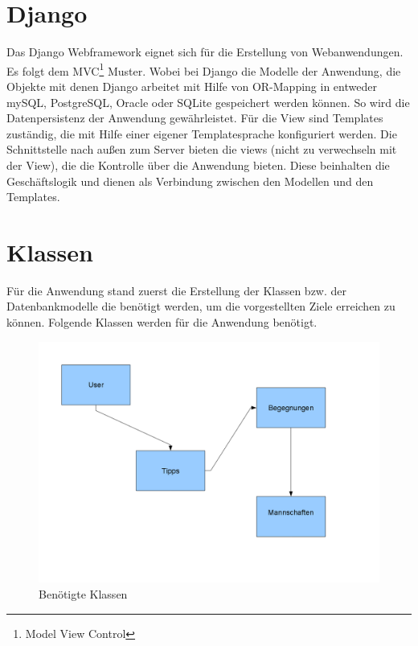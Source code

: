 \section{Django}
Das Django Webframework eignet sich für die Erstellung von Webanwendungen. Es
folgt dem MVC\footnote{Model View Control} Muster. Wobei bei Django die Modelle
der Anwendung, die Objekte mit denen Django arbeitet mit Hilfe von OR-Mapping
in entweder mySQL, PostgreSQL, Oracle oder SQLite gespeichert werden können. So
wird die Datenpersistenz der Anwendung gewährleistet. Für die View sind
Templates zuständig, die mit Hilfe einer eigener Templatesprache konfiguriert
werden. Die Schnittstelle nach außen zum Server bieten die views (nicht zu
verwechseln mit der View), die die Kontrolle über die Anwendung bieten. Diese
beinhalten die Geschäftslogik und dienen als Verbindung zwischen den Modellen
und den Templates.

\section{Klassen}
Für die Anwendung stand zuerst die Erstellung der Klassen bzw. der
Datenbankmodelle die benötigt werden, um die vorgestellten Ziele erreichen zu
können. Folgende Klassen werden für die Anwendung benötigt. 

\begin{figure}[ht]
 \begin{center}
  \includegraphics[scale=0.5]{pictures/klassen.png}
 \end{center}
 \caption{Benötigte Klassen}
 \label{klassen}
\end{figure}

